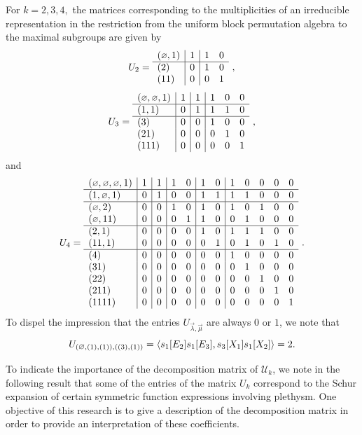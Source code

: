 \documentclass[ALCO,Unicode]{cedram}
\newcommand{\epart}{\text{\footnotesize$\varnothing$}}
\begin{document}
\begin{example}  
For $k=2,3,4,$ the matrices corresponding to the multiplicities of an irreducible 
representation in the restriction from the uniform block permutation algebra
to the maximal subgroups are given by
$$
U_2 =
\begin{array}{l|r|rr}
(\epart, 1) & 1 & 1 & 0\\
\hline
(2) & 0 & 1 & 0\\
(11) & 0 & 0 & 1
\end{array}~,
$$
$$
U_3 = \begin{array}{l|r|r|rrr}
(\epart, \epart, 1) & 1 & 1 & 1 & 0 & 0\\
\hline
(1, 1) & 0 & 1 & 1 & 1 & 0\\
\hline
(3) & 0 & 0 & 1 & 0 & 0\\
(21) & 0 & 0 & 0 & 1 & 0\\
(111) & 0 & 0 & 0 & 0 & 1
\end{array}~,
$$
and
$$
U_4 = \begin{array}{l|r|r|rr|rr|rrrrr}
(\epart, \epart, \epart, 1) & 1 & 1 & 1 & 0 & 1 & 0 & 1 & 0 & 0 & 0 & 0\\
\hline
(1, \epart, 1) &0 & 1 & 0 & 0 & 1 & 1 & 1 & 1 & 0 & 0 & 0\\
\hline
(\epart, 2) &0 & 0 & 1 & 0 & 1 & 0 & 1 & 0 & 1 & 0 & 0\\
(\epart, 11) &0 & 0 & 0 & 1 & 1 & 0 & 0 & 1 & 0 & 0 & 0\\
\hline
(2, 1) &0 & 0 & 0 & 0 & 1 & 0 & 1 & 1 & 1 & 0 & 0\\
(11, 1) &0 & 0 & 0 & 0 & 0 & 1 & 0 & 1 & 0 & 1 & 0\\
\hline
(4) &0 & 0 & 0 & 0 & 0 & 0 & 1 & 0 & 0 & 0 & 0\\
(31) &0 & 0 & 0 & 0 & 0 & 0 & 0 & 1 & 0 & 0 & 0\\
(22) &0 & 0 & 0 & 0 & 0 & 0 & 0 & 0 & 1 & 0 & 0\\
(211) &0 & 0 & 0 & 0 & 0 & 0 & 0 & 0 & 0 & 1 & 0\\
(1111) &0 & 0 & 0 & 0 & 0 & 0 & 0 & 0 & 0 & 0 & 1
\end{array}~.
$$
To dispel the impression that the entries $U_{\vec{\lambda},\vec{\mu}}$ are always $0$ or $1$,
we note that
\begin{equation*}
    U_{(\epart,(1),(1)), ((3),(1))} = \left< s_1[E_2] s_1[E_3], s_3[X_1] s_1[X_2] \right> = 2.
\end{equation*}
\end{example}

To indicate the importance of the decomposition matrix of $\mathcal{U}_k$,
we note in the following result that some of the entries of the matrix $U_k$
correspond to the Schur expansion of certain
symmetric function expressions involving plethysm.
One objective of this research is to give a description of
the decomposition matrix in order to provide an interpretation
of these coefficients.
\end{document}
